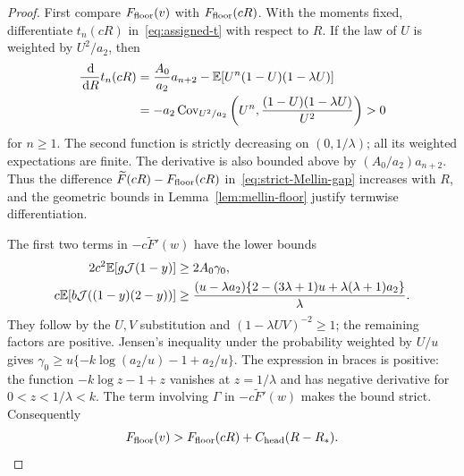 \begin{proof}
First compare $F_{\rm floor}(v)$ with $F_{\rm floor}(cR)$.
With the moments fixed, differentiate $t_n(cR)$ in~\eqref{eq:assigned-t}
with respect to $R$. If the law of $U$ is weighted by $U^2/a_2$, then
\[\begin{aligned}
 \frac{\,\mathrm d}{\,\mathrm d R}t_n(cR)
 &=\frac{A_0}{a_2}a_{n+2}
       -\mathbb E[U^n(1-U)(1-\lambda U)]\\
 &=-a_2\operatorname{Cov}_{U^2/a_2}
       \left(U^n,\frac{(1-U)(1-\lambda U)}{U^2}\right)>0
\end{aligned}\]
for $n\ge1$.  The second function is strictly decreasing on
$(0,1/\lambda)$; all its weighted expectations are finite.  The
derivative is also bounded above by $(A_0/a_2)a_{n+2}$.
Thus the difference $\widetilde F(cR)-F_{\rm floor}(cR)$ in~\eqref{eq:strict-Mellin-gap} increases with
$R$, and the geometric bounds in Lemma~\ref{lem:mellin-floor}
justify termwise differentiation.

The first two terms in $-c\widetilde F'(w)$ have the lower bounds
\begin{align*}
 2c^2\mathbb E[g\mathcal J(1-y)]&\ge2A_0\gamma_0,\\
 c\mathbb E[b\mathcal J((1-y)(2-y))]&\ge
 \frac{(u-\lambda a_2)
       \{2-(3\lambda+1)u+\lambda(\lambda+1)a_2\}}\lambda.
\end{align*}
They follow by the $U,V$ substitution and
$(1-\lambda UV)^{-2}\ge1$; the remaining factors are positive.
Jensen's inequality under the probability weighted by $U/u$ gives
$\gamma_0\ge u\{-k\log(a_2/u)-1+a_2/u\}$.
The expression in braces is positive: the function
$-k\log z-1+z$ vanishes at $z=1/\lambda$ and has negative derivative
for $0<z<1/\lambda<k$. The term involving $\Gamma$ in
$-c\widetilde F'(w)$ makes the bound strict. Consequently
\begin{equation}\label{eq:low-slope-credit}
 F_{\rm floor}(v)>F_{\rm floor}(cR)+C_{\rm head}(R-R_*).
\end{equation}


\end{proof}
